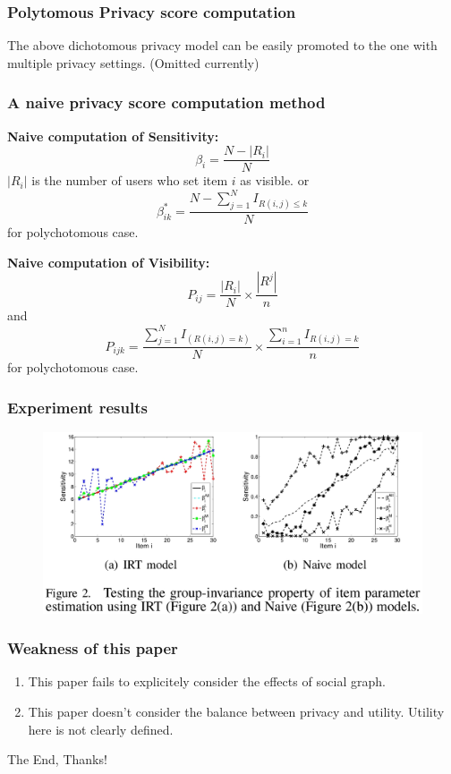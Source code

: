 \documentclass{beamer}
\begin{document}
\begin{frame}
  \frametitle{Polytomous Privacy score computation}
  The above dichotomous privacy model can be easily promoted to the one with
  multiple privacy settings. (Omitted currently)
\end{frame}

% 
\begin{frame}
  \frametitle{A naive privacy score computation method}

  \textbf{Naive computation of Sensitivity:}
  \[\beta_i=\frac{N-|R_i|}{N}\] 
  $|R_i|$ is the number of users who set item $i$ as visible. or 
  \[\beta_{ik}^*=\frac{N-\sum_{j=1}^NI_{R(i,j)\leq k}}{N}\] for polychotomous case. 

  \textbf{Naive computation of Visibility:}
  \[P_{ij}=\frac{|R_i|}{N}\times \frac{|R^j|}{n}\] and 
  \[P_{ijk}=\frac{\sum_{j=1}^NI_{(R(i,j)=k)}}{N}\times
  \frac{\sum_{i=1}^nI_{R(i,j)=k}}{n}\]
  for polychotomous case. 
\end{frame}

\begin{frame}
  \frametitle{Experiment results}
  \begin{figure}
    \begin{center}
    \includegraphics[scale=0.25]{result}
  \end{center}
  \end{figure}
\end{frame}

\begin{frame}
  \frametitle{Weakness of this paper}
  \begin{enumerate}
    \item This paper fails to explicitely consider the effects of
      social graph. 
    \item This paper doesn't consider the balance between privacy and
      utility. Utility here is not clearly defined. 
  \end{enumerate} 
\end{frame}

\begin{frame}
  \centerline{The End, Thanks!}
\end{frame}
\end{document}
